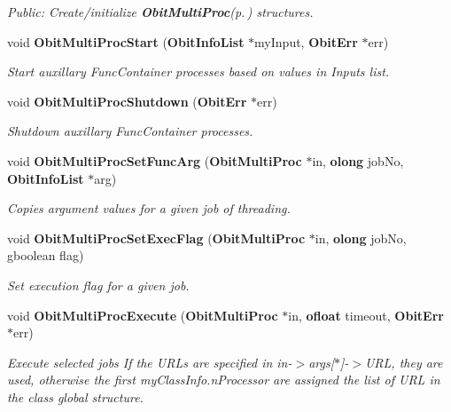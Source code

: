 \begin{CompactItemize}
\begin{CompactList}\small\item\em Public: Create/initialize {\bf Obit\-Multi\-Proc}{\rm (p.\,\pageref{structObitMultiProc})} structures. \item\end{CompactList}\item 
void {\bf Obit\-Multi\-Proc\-Start} ({\bf Obit\-Info\-List} $\ast$my\-Input, {\bf Obit\-Err} $\ast$err)
\begin{CompactList}\small\item\em Start auxillary Func\-Container processes based on values in Inputs list. \item\end{CompactList}\item 
void {\bf Obit\-Multi\-Proc\-Shutdown} ({\bf Obit\-Err} $\ast$err)
\begin{CompactList}\small\item\em Shutdown auxillary Func\-Container processes. \item\end{CompactList}\item 
void {\bf Obit\-Multi\-Proc\-Set\-Func\-Arg} ({\bf Obit\-Multi\-Proc} $\ast$in, {\bf olong} job\-No, {\bf Obit\-Info\-List} $\ast$arg)
\begin{CompactList}\small\item\em Copies argument values for a given job of threading. \item\end{CompactList}\item 
void {\bf Obit\-Multi\-Proc\-Set\-Exec\-Flag} ({\bf Obit\-Multi\-Proc} $\ast$in, {\bf olong} job\-No, gboolean flag)
\begin{CompactList}\small\item\em Set execution flag for a given job. \item\end{CompactList}\item 
void {\bf Obit\-Multi\-Proc\-Execute} ({\bf Obit\-Multi\-Proc} $\ast$in, {\bf ofloat} timeout, {\bf Obit\-Err} $\ast$err)
\begin{CompactList}\small\item\em Execute selected jobs If the URLs are specified in in-$>$args[$\ast$]-$>$URL, they are used, otherwise the first my\-Class\-Info.n\-Processor are assigned the list of URL in the class global structure. \item\end{CompactList}\item 

\end{CompactItemize}
